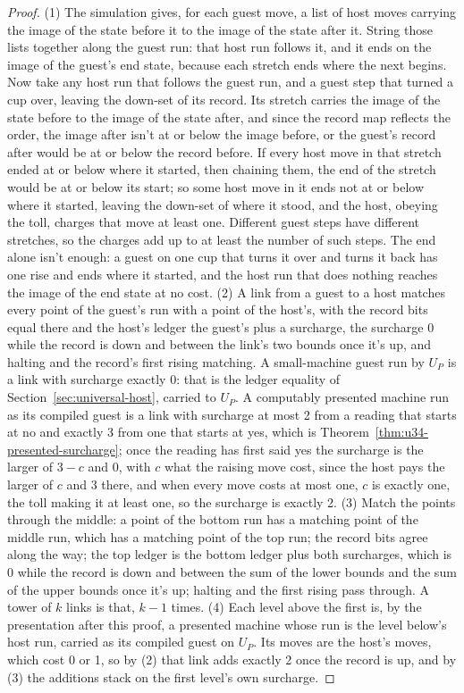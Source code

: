 \documentclass[11pt,twoside]{article}
\theoremstyle{thielethm}
\theoremstyle{thieledef}
\theoremstyle{thieledef}
\theoremstyle{thieledef}
\theoremstyle{thielethm}
\theoremstyle{thieleobs}
\theoremstyle{thielethm}
\begin{document}
\begin{proof}
(1) The simulation gives, for each guest move, a list of host moves carrying the image of the
state before it to the image of the state after it. String those lists together along the guest
run: that host run follows it, and it ends on the image of the guest's end state, because each
stretch ends where the next begins. Now take any host run that follows the guest run, and a guest
step that turned a cup over, leaving the down-set of its record. Its stretch carries the image of
the state before to the image of the state after, and since the record map reflects the order, the
image after isn't at or below the image before, or the guest's record after would be at or below
the record before. If every host move in that stretch ended at or below where it started, then
chaining them, the end of the stretch would be at or below its start; so some host move in it ends
not at or below where it started, leaving the down-set of where it stood, and the host, obeying
the toll, charges that move at least one. Different guest
steps have different stretches, so the charges add up to at least the number of such steps. The
end alone isn't enough: a guest on one cup that turns it over and turns it back has one rise and
ends where it started, and the host run that does nothing reaches the image of the end state at
no cost. (2) A link from a guest to a host matches every point of the guest's run with a point of
the host's, with the record bits equal there and the host's ledger the guest's plus a surcharge,
the surcharge 0 while the record is down and between the link's two bounds once it's up, and
halting and the record's first rising matching. A small-machine guest run by $U_P$ is a link with
surcharge exactly 0: that is the ledger equality of Section~\ref{sec:universal-host}, carried to
$U_P$. A computably presented machine run as its compiled guest is a link with surcharge at most 2
from a reading that starts at no and exactly 3 from one that starts at yes, which is
Theorem~\ref{thm:u34-presented-surcharge}; once the reading has first said yes the surcharge is
the larger of $3 - c$ and 0, with $c$ what the raising move cost, since the host pays the larger
of $c$ and 3 there, and when every move costs at most one, $c$ is exactly
one, the toll making it at least one, so the surcharge is exactly 2. (3) Match the points through
the middle: a point of the bottom run has a matching point of the middle run, which has a matching
point of the top run; the record bits agree along the way; the top ledger is the bottom ledger plus
both surcharges, which is 0 while the record is down and between the sum of the lower bounds and
the sum of the upper bounds once it's up; halting and the first rising pass through. A tower of $k$
links is that, $k - 1$ times. (4) Each level above the first is, by the presentation after this proof, a presented machine whose run is the level below's host run, carried as its compiled guest on $U_P$. Its moves
are the host's moves, which cost 0 or 1, so by (2) that link adds exactly 2 once the record is up,
and by (3) the additions stack on the first level's own surcharge.
\end{proof}
\end{document}
